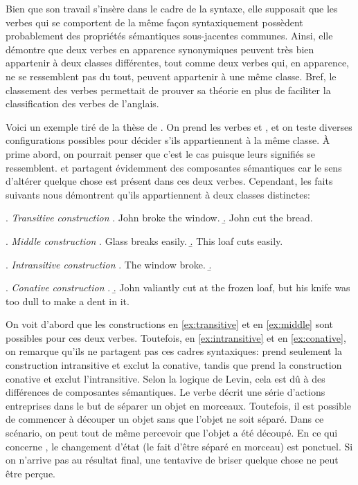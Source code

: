 Bien que son travail s'insère dans le cadre de la syntaxe, elle supposait que les verbes qui se comportent de la même façon syntaxiquement possèdent probablement des propriétés sémantiques sous-jacentes communes. Ainsi, elle démontre que deux verbes en apparence synonymiques peuvent très bien appartenir à deux classes différentes, tout comme deux verbes qui, en apparence, ne se ressemblent pas du tout, peuvent appartenir à une même classe. Bref, le classement des verbes permettait de prouver sa théorie en plus de faciliter la classification des verbes de l'anglais.

Voici un exemple tiré de la thèse de \cite[pp.~12--13]{SchulerVerbnetBroadcoverageComprehensive2005}. On prend les verbes  et , et on teste diverses configurations possibles pour décider s'ils appartiennent à la même classe. À prime abord, on pourrait penser que c'est le cas puisque leurs signifiés se ressemblent.  et  partagent évidemment des composantes sémantiques car le sens d'altérer quelque chose est présent dans ces deux verbes. Cependant, les faits suivants nous démontrent qu'ils appartiennent à deux classes distinctes:

\ex. \label{ex:transitive} \emph{Transitive construction}
	\a. John broke the window.
	\b. John cut the bread.
	
\ex. \label{ex:middle} \emph{Middle construction}
	\a. Glass breaks easily.
	\b. This loaf cuts easily.
	
\ex. \label{ex:intransitive} \emph{Intransitive construction}
	\a. The window broke.
	\b. 

\ex. \label{ex:conative} \emph{Conative construction}
	\a.
	\b. John valiantly cut at the frozen loaf, but his knife was too dull to make a dent in it.


On voit d'abord que les constructions en \ref{ex:transitive} et en \ref{ex:middle} sont possibles pour ces deux verbes. Toutefois, en \ref{ex:intransitive} et en \ref{ex:conative}, on remarque qu'ils ne partagent pas ces cadres syntaxiques:  prend seulement la construction intransitive et exclut la conative, tandis que  prend la construction conative et exclut l'intransitive. Selon la logique de Levin, cela est dû à des différences de composantes sémantiques. Le verbe  décrit une série d'actions entreprises dans le but de séparer un objet en morceaux. Toutefois, il est possible de commencer à découper un objet sans que l'objet ne soit séparé. Dans ce scénario, on peut tout de même percevoir que l'objet a été découpé. En ce qui concerne , le changement d'état (le fait d'être séparé en morceau) est ponctuel. Si on n'arrive pas au résultat final, une tentavive de briser quelque chose ne peut être perçue.

